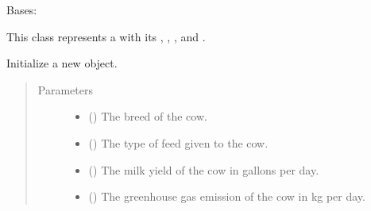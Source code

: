 \documentclass[letterpaper,10pt,english]{sphinxmanual}
\begin{document}
\begin{fulllineitems}
\label{\detokenize{farming:farming.farm1.Cow}}
\sphinxAtStartPar
Bases: 

\sphinxAtStartPar
This class represents a  with its {\hyperref[\detokenize{farming:farming.farm1.Cow.breed}]{}}, {\hyperref[\detokenize{farming:farming.farm1.Cow.feed_type}]{}}, {\hyperref[\detokenize{farming:farming.farm1.Cow.milk_yield}]{}}, and 
{\hyperref[\detokenize{farming:farming.farm1.Cow.ghg_emission}]{}}.

\sphinxAtStartPar
Initialize a new {\hyperref[\detokenize{farming:farming.farm1.Cow}]{}} object.
\begin{quote}\begin{description}
\item[{Parameters}] \leavevmode\begin{itemize}
\item {} 
\sphinxAtStartPar
{} () \textendash{} The breed of the cow.

\item {} 
\sphinxAtStartPar
{} () \textendash{} The type of feed given to the cow.

\item {} 
\sphinxAtStartPar
{} () \textendash{} The milk yield of the cow in gallons per day.

\item {} 
\sphinxAtStartPar
{} () \textendash{} The greenhouse gas emission of the cow in kg per day.


\end{itemize}
\end{description}
\end{quote}
\end{fulllineitems}
\end{document}
